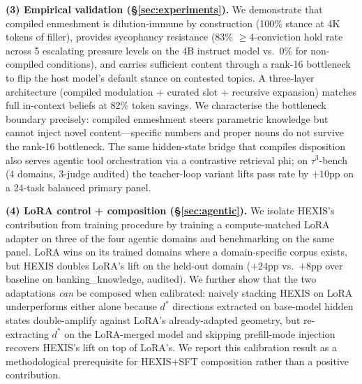 \textbf{(3) Empirical validation (\S\ref{sec:experiments}).} We demonstrate that compiled enmeshment is dilution-immune by construction (100\% stance at 4K tokens of filler), provides sycophancy resistance (83\% $\geq$4-conviction hold rate across 5 escalating pressure levels on the 4B instruct model vs.\ 0\% for non-compiled conditions), and carries sufficient content through a rank-16 bottleneck to flip the host model's default stance on contested topics. A three-layer architecture (compiled modulation + curated slot + recursive expansion) matches full in-context beliefs at 82\% token savings. We characterise the bottleneck boundary precisely: compiled enmeshment steers parametric knowledge but cannot inject novel content---specific numbers and proper nouns do not survive the rank-16 bottleneck. The same hidden-state bridge that compiles disposition also serves agentic tool orchestration via a contrastive retrieval phi; on $\tau^3$-bench (4 domains, 3-judge audited) the teacher-loop variant lifts pass rate by $+10$pp on a 24-task balanced primary panel.

\textbf{(4) LoRA control + composition (\S\ref{sec:agentic}).} We isolate HEXIS's contribution from training procedure by training a compute-matched LoRA adapter on three of the four agentic domains and benchmarking on the same panel. LoRA wins on its trained domains where a domain-specific corpus exists, but HEXIS doubles LoRA's lift on the held-out domain ($+24$pp vs.\ $+8$pp over baseline on banking\_knowledge, audited). We further show that the two adaptations \emph{can} be composed when calibrated: naively stacking HEXIS on LoRA underperforms either alone because $d^*$ directions extracted on base-model hidden states double-amplify against LoRA's already-adapted geometry, but re-extracting $d^*$ on the LoRA-merged model and skipping prefill-mode injection recovers HEXIS's lift on top of LoRA's. We report this calibration result as a methodological prerequisite for HEXIS+SFT composition rather than a positive contribution.

